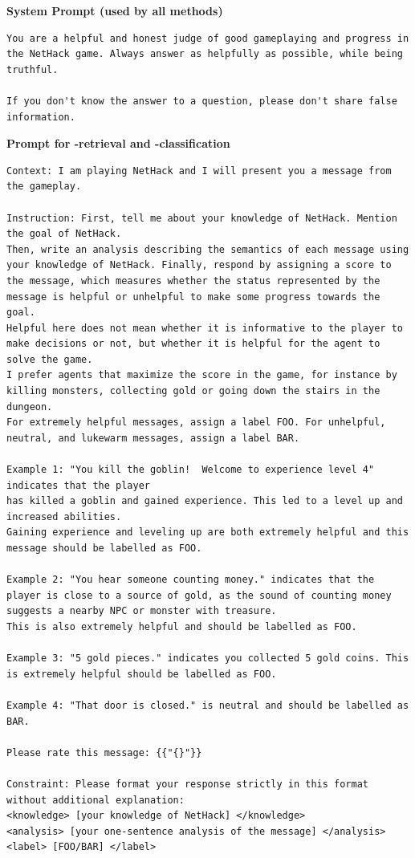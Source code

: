 \textbf{System Prompt (used by all methods)}

\begin{lstlisting}
You are a helpful and honest judge of good gameplaying and progress in the NetHack game. Always answer as helpfully as possible, while being truthful.

If you don't know the answer to a question, please don't share false information.
\end{lstlisting}


\textbf{Prompt for \oni-retrieval and \oni-classification}

%

\begin{lstlisting}
Context: I am playing NetHack and I will present you a message from the gameplay.

Instruction: First, tell me about your knowledge of NetHack. Mention the goal of NetHack.
Then, write an analysis describing the semantics of each message using your knowledge of NetHack. Finally, respond by assigning a score to the message, which measures whether the status represented by the message is helpful or unhelpful to make some progress towards the goal.
Helpful here does not mean whether it is informative to the player to make decisions or not, but whether it is helpful for the agent to solve the game.
I prefer agents that maximize the score in the game, for instance by killing monsters, collecting gold or going down the stairs in the dungeon.
For extremely helpful messages, assign a label FOO. For unhelpful, neutral, and lukewarm messages, assign a label BAR.

Example 1: "You kill the goblin!  Welcome to experience level 4" indicates that the player
has killed a goblin and gained experience. This led to a level up and increased abilities.
Gaining experience and leveling up are both extremely helpful and this message should be labelled as FOO.

Example 2: "You hear someone counting money." indicates that the player is close to a source of gold, as the sound of counting money suggests a nearby NPC or monster with treasure.
This is also extremely helpful and should be labelled as FOO.

Example 3: "5 gold pieces." indicates you collected 5 gold coins. This is extremely helpful should be labelled as FOO.

Example 4: "That door is closed." is neutral and should be labelled as BAR.

Please rate this message: {{"{}"}}

Constraint: Please format your response strictly in this format without additional explanation:
<knowledge> [your knowledge of NetHack] </knowledge>
<analysis> [your one-sentence analysis of the message] </analysis>
<label> [FOO/BAR] </label>
\end{lstlisting}


